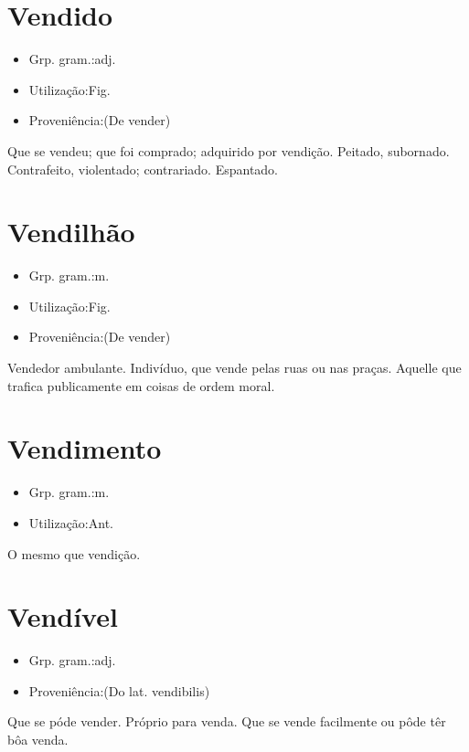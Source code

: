 \documentclass{article}
\begin{document}
\section{Vendido}
\begin{itemize}
\item {Grp. gram.:adj.}
\end{itemize}
\begin{itemize}
\item {Utilização:Fig.}
\end{itemize}
\begin{itemize}
\item {Proveniência:(De \textunderscore vender\textunderscore )}
\end{itemize}
Que se vendeu; que foi comprado; adquirido por vendição.
Peitado, subornado.
Contrafeito, violentado; contrariado.
Espantado.
\section{Vendilhão}
\begin{itemize}
\item {Grp. gram.:m.}
\end{itemize}
\begin{itemize}
\item {Utilização:Fig.}
\end{itemize}
\begin{itemize}
\item {Proveniência:(De \textunderscore vender\textunderscore )}
\end{itemize}
Vendedor ambulante.
Indivíduo, que vende pelas ruas ou nas praças.
Aquelle que trafica publicamente em coisas de ordem moral.
\section{Vendimento}
\begin{itemize}
\item {Grp. gram.:m.}
\end{itemize}
\begin{itemize}
\item {Utilização:Ant.}
\end{itemize}
O mesmo que \textunderscore vendição\textunderscore .
\section{Vendível}
\begin{itemize}
\item {Grp. gram.:adj.}
\end{itemize}
\begin{itemize}
\item {Proveniência:(Do lat. \textunderscore vendibilis\textunderscore )}
\end{itemize}
Que se póde vender.
Próprio para venda.
Que se vende facilmente ou pôde têr bôa venda.
\end{document}

